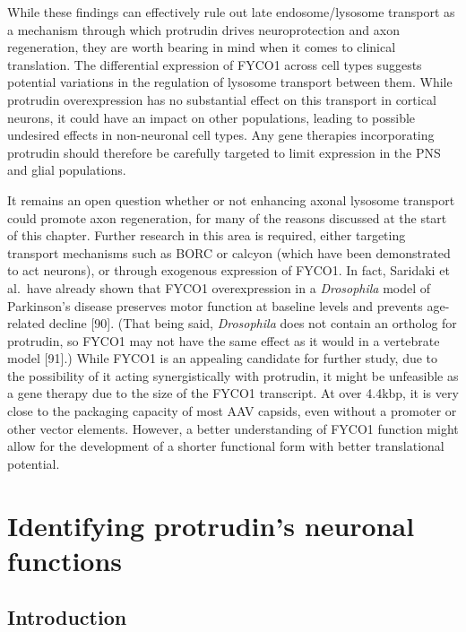 \documentclass[
  12pt,
  a4paper,
]{book}
\renewcommand{\chaptermark}[1]{\markboth{#1}{}}
\begin{document}
While these findings can effectively rule out late endosome/lysosome transport as a mechanism through which protrudin drives neuroprotection and axon regeneration, they are worth bearing in mind when it comes to clinical translation. The differential expression of FYCO1 across cell types suggests potential variations in the regulation of lysosome transport between them. While protrudin overexpression has no substantial effect on this transport in cortical neurons, it could have an impact on other populations, leading to possible undesired effects in non-neuronal cell types. Any gene therapies incorporating protrudin should therefore be carefully targeted to limit expression in the PNS and glial populations.

It remains an open question whether or not enhancing axonal lysosome transport could promote axon regeneration, for many of the reasons discussed at the start of this chapter. Further research in this area is required, either targeting transport mechanisms such as BORC or calcyon (which have been demonstrated to act neurons), or through exogenous expression of FYCO1. In fact, Saridaki et al.~have already shown that FYCO1 overexpression in a \emph{Drosophila} model of Parkinson's disease preserves motor function at baseline levels and prevents age-related decline {[}90{]}. (That being said, \emph{Drosophila} does not contain an ortholog for protrudin, so FYCO1 may not have the same effect as it would in a vertebrate model {[}91{]}.) While FYCO1 is an appealing candidate for further study, due to the possibility of it acting synergistically with protrudin, it might be unfeasible as a gene therapy due to the size of the FYCO1 transcript. At over 4.4kbp, it is very close to the packaging capacity of most AAV capsids, even without a promoter or other vector elements. However, a better understanding of FYCO1 function might allow for the development of a shorter functional form with better translational potential.

\hypertarget{identifying-protrudins-neuronal-functions}{%
\chapter{Identifying protrudin's neuronal functions}\label{identifying-protrudins-neuronal-functions}}

\chaptermark{Neuronal functions}

\hypertarget{introduction-1}{%
\section{Introduction}\label{introduction-1}}
\end{document}
